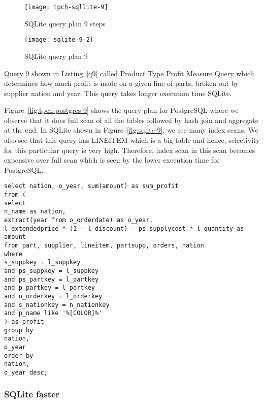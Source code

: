 \begin{figure*}[ht]
\centering
     \begin{subfigure}[b]{0.4\textwidth}
         \centering
         \texttt{[image: tpch-sqllite-9]}
         \caption{SQLite query plan 9 steps}
         \label{fig:tpch-sqllite-9}
     \end{subfigure}
     \hfill
     \begin{subfigure}[b]{0.4\textwidth}
         \centering
         \texttt{[image: sqlite-9-2]}
         \caption{SQLite query plan 9}
         \label{fig:sqlite-9-2}
     \end{subfigure}

        \caption{SQLite plan for query 9}
        \label{fig:sqlite-9}
\end{figure*}
Query 9 shown in Listing~\ref{q9} called Product Type Profit Measure Query which determines how much profit is made on a given line of parts, broken out by supplier nation and year. This query takes longer execution time SQLite.

Figure~\ref{fig:tpch-postgres-9} shows the query plan for PostgreSQL where we observe that it does full scan of all the tables followed by hash join and aggregate at the end. In SQLite shown in Figure~\ref{fig:sqlite-9}, we see many index scans. We also see that this query has LINEITEM which is a big table and hence, selectivity for this particular query is very high. Therefore, index scan in this scan becomes expensive over full scan which is seen by the lower execution time for PostgreSQL.

\begin{minipage}{\linewidth}
\begin{lstlisting}[breaklines=true, numbers=none, label=q9, caption=Query 9]
select nation, o_year, sum(amount) as sum_profit
from (
select
n_name as nation,
extract(year from o_orderdate) as o_year,
l_extendedprice * (1 - l_discount) - ps_supplycost * l_quantity as amount
from part, supplier, lineitem, partsupp, orders, nation
where
s_suppkey = l_suppkey
and ps_suppkey = l_suppkey
and ps_partkey = l_partkey
and p_partkey = l_partkey
and o_orderkey = l_orderkey
and s_nationkey = n_nationkey
and p_name like '%[COLOR]%'
) as profit
group by
nation,
o_year
order by
nation,
o_year desc;
\end{lstlisting}
\end{minipage}

\subsubsection{SQLite faster}


